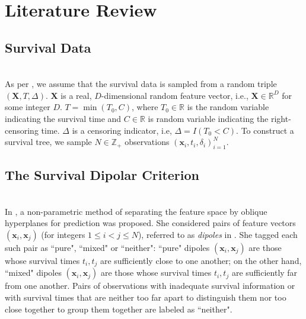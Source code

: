 \documentclass[12pt]{amsart}
\theoremstyle{definition}
\theoremstyle{plain}
\theoremstyle{remark}
\newcommand{\RR}{\mathbb{R}}
\newcommand{\ZZ}{\mathbb{Z}}
\begin{document}
\section{Literature Review} %


\subsection{Survival Data} \hfill \\


As per \cite{kretowska}, we assume that the survival data is sampled from a random triple $(\mathbf{X}, T, \Delta)$. $\mathbf{X}$ is a real, $D$-dimensional random feature vector, i.e., $\mathbf{X} \in \RR^D$ for some integer $D$. $T = \min(T_0, C)$, where $T_0 \in \RR$ is the random variable indicating the survival time and $C \in \RR$ is random variable indicating the right-censoring time. $\Delta$ is a censoring indicator, i.e, $\Delta = I(T_0 < C)$. To construct a survival tree, we sample $N \in \ZZ_+$ observations $(\mathbf{x}_i, t_i, \delta_i)_{i = 1}^N$. 


\subsection{The Survival Dipolar Criterion} \hfill \\


In \cite{kretowska}, a non-parametric method of separating the feature space by oblique hyperplanes for prediction was proposed. She considered pairs of feature vectors $(\mathbf{x}_i, \mathbf{x}_j)$ (for integers $1 \leq i < j \leq N$), referred to as \emph{dipoles} in \cite{bobrowskikretowski}. She tagged each such pair as ``pure", ``mixed" or ``neither": ``pure" dipoles $(\mathbf{x}_i, \mathbf{x}_j)$ are those whose survival times $t_i, t_j$ are sufficiently close to one another; on the other hand, ``mixed" dipoles $(\mathbf{x}_i, \mathbf{x}_j)$ are those whose survival times $t_i, t_j$ are sufficiently far from one another.  Pairs of observations with inadequate survival information or with survival times that are neither too far apart to distinguish them nor too close together to group them together are labeled as ``neither". \\
\end{document}

